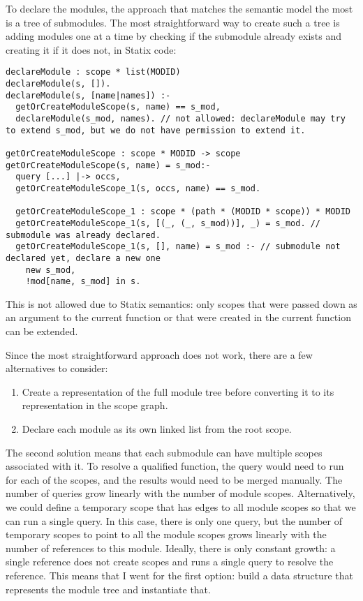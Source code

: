 To declare the modules, the approach that matches the semantic model the most is a tree of submodules.
The most straightforward way to create such a tree is adding modules one at a time by checking if the submodule already exists and creating it if it does not, in Statix code:
\begin{verbatim}
declareModule : scope * list(MODID)
declareModule(s, []).
declareModule(s, [name|names]) :-
  getOrCreateModuleScope(s, name) == s_mod,
  declareModule(s_mod, names). // not allowed: declareModule may try to extend s_mod, but we do not have permission to extend it.

getOrCreateModuleScope : scope * MODID -> scope
getOrCreateModuleScope(s, name) = s_mod:-
  query [...] |-> occs,
  getOrCreateModuleScope_1(s, occs, name) == s_mod.

  getOrCreateModuleScope_1 : scope * (path * (MODID * scope)) * MODID
  getOrCreateModuleScope_1(s, [(_, (_, s_mod))], _) = s_mod. // submodule was already declared.
  getOrCreateModuleScope_1(s, [], name) = s_mod :- // submodule not declared yet, declare a new one
    new s_mod,
    !mod[name, s_mod] in s.
\end{verbatim}
This is not allowed due to Statix semantics: only scopes that were passed down as an argument to the current function or that were created in the current function can be extended.

Since the most straightforward approach does not work, there are a few alternatives to consider:
\begin{enumerate}
  \item Create a representation of the full module tree before converting it to its representation in the scope graph.
  \item Declare each module as its own linked list from the root scope.
\end{enumerate}

The second solution means that each submodule can have multiple scopes associated with it.
To resolve a qualified function, the query would need to run for each of the scopes, and the results would need to be merged manually.
The number of queries grow linearly with the number of module scopes.
Alternatively, we could define a temporary scope that has  edges to all module scopes so that we can run a single query.
In this case, there is only one query, but the number of temporary scopes to point to all the module scopes grows linearly with the number of references to this module.
Ideally, there is only constant growth: a single reference does not create scopes and runs a single query to resolve the reference.
This means that I went for the first option: build a data structure that represents the module tree and instantiate that.

